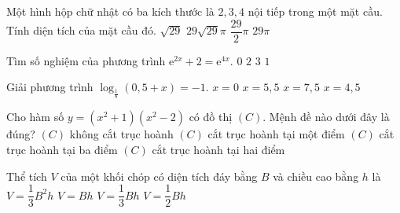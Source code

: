\begin{ex}%
	Một hình hộp chữ nhật có ba kích thước là $2, 3, 4$ nội tiếp trong một mặt cầu. Tính diện tích của mặt cầu đó.
	\choice
	{$\sqrt{29}$}
	{$29\sqrt{29}\pi$}
	{$\dfrac{29}{2}\pi$}
	{\True $29\pi$}
\end{ex}

\begin{ex}%
	Tìm số nghiệm của phương trình $\mathrm{e}^{2x}+2=\mathrm{e}^{4x}$.
	\choice
	{$0$}
	{$2$}
	{$3$}
	{\True $1$}
\end{ex}


\begin{ex}%
	Giải phương trình $\log_{\frac{1}{8}}(0,5+x)=-1$.
	\choice
	{$x=0$}
	{$x=5,5$}
	{\True $x=7,5$}
	{$x=4,5$}
\end{ex}


\begin{ex}%
	Cho hàm số $y=\left(x^2+1\right)\left(x^2-2\right)$ có đồ thị $(C)$. Mệnh đề nào dưới đây là đúng?
	\choice
	{$(C)$ không cắt trục hoành}
	{$(C)$ cắt trục hoành tại một điểm}
	{$(C)$ cắt trục hoành tại ba điểm}
	{\True $(C)$ cắt trục hoành tại hai điểm}
\end{ex}


\begin{ex}%
	Thể tích $V$ của một khối chóp có diện tích đáy bằng $B$ và chiều cao bằng $h$ là
	\choice
	{$V=\dfrac{1}{3}B^2h$}
	{$V=Bh$}
	{\True $V=\dfrac{1}{3}Bh$}
	{$V=\dfrac{1}{2}Bh$}
\end{ex}


